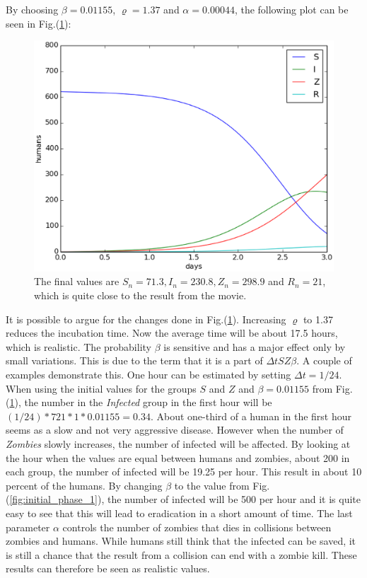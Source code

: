 \documentclass[%
twoside,                 %
final,                   %
10pt]{article}
\begin{document}
By choosing $\beta = 0.01155$, $\varrho=1.37$ and $\alpha=0.00044$, the following plot can be seen in Fig.(\ref{fig:initial_phase_2}):  


\begin{figure}[ht]
  \centerline{\includegraphics[width=0.9\linewidth]{plots/WD_zombie_initial_2.eps}}
  \caption{
  \label{fig:initial_phase_2} The final values are $S_n=71.3,I_n=230.8,Z_n=298.9$ and $R_n=21$, which is quite close to the result from the movie.
  }
\end{figure}


It is possible to argue for the changes done in Fig.(\ref{fig:initial_phase_2}). Increasing $\varrho$ to 1.37 reduces the incubation time. Now the average time will be about 17.5 hours, which is realistic. The probability $\beta$ is sensitive and has a major effect only by small variations. This is due to the term that it is a part of $\Delta t SZ \beta$. A couple of examples demonstrate this. One hour can be estimated by setting $\Delta t = 1/24$. When using the initial values for the groups $S$ and $Z$ and $\beta=0.01155$ from Fig.(\ref{fig:initial_phase_2}), the number in the \emph{Infected} group in the first hour will be $(1/24)*721*1*0.01155=0.34$. About  one-third of a human in the first hour seems as a slow and not very aggressive disease. However when the number of \emph{Zombies} slowly increases, the number of infected will be affected. By looking at the hour when the values are equal between humans and zombies, about 200 in each group, the number of infected will be 19.25 per hour. This result in about 10 percent of the humans. By changing $\beta$ to the value from Fig.(\ref{fig:initial_phase_1}), the number of infected will be 500 per hour and it is quite easy to see that this will lead to eradication in a short amount of time. The last parameter $\alpha$ controls the number of zombies that dies in collisions between zombies and humans. While humans still think that the infected can be saved, it is still a chance that the result from a collision can end with a zombie kill. These results can therefore be seen as realistic values.
\end{document}
